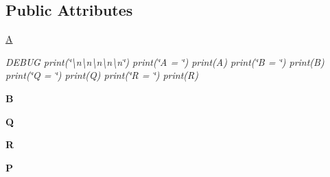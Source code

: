\subsection*{Public Attributes}
\begin{DoxyCompactItemize}
\item 
\mbox{\label{class_d_o_t__assignment_1_1controls_1_1_linear_feedback_const_tracker_ae6ca89f8631d4f212e60a7bcdd1a1c7f}} 
\mbox{\hyperlink{class_d_o_t__assignment_1_1controls_1_1_linear_feedback_const_tracker_ae6ca89f8631d4f212e60a7bcdd1a1c7f}{A}}
\begin{DoxyCompactList}\small\item\em D\+E\+B\+UG print(\char`\"{}\textbackslash{}n\textbackslash{}n\textbackslash{}n\textbackslash{}n\textbackslash{}n\char`\"{}) print(\char`\"{}\+A = \char`\"{}) print(\+A) print(\char`\"{}\+B = \char`\"{}) print(\+B) print(\char`\"{}\+Q = \char`\"{}) print(\+Q) print(\char`\"{}\+R = \char`\"{}) print(\+R) \end{DoxyCompactList}\item 
\mbox{\label{class_d_o_t__assignment_1_1controls_1_1_linear_feedback_const_tracker_ae1fb3b13eca8607104c74088e2190c1b}} 
{\bfseries B}
\item 
\mbox{\label{class_d_o_t__assignment_1_1controls_1_1_linear_feedback_const_tracker_a61d2e8a035a44e057838398946c23c8a}} 
{\bfseries Q}
\item 
\mbox{\label{class_d_o_t__assignment_1_1controls_1_1_linear_feedback_const_tracker_a7cd6f1af49976ac1c672cb6d201f61a5}} 
{\bfseries R}
\item 
\mbox{\label{class_d_o_t__assignment_1_1controls_1_1_linear_feedback_const_tracker_a5b159d678fc5b151e61b6f76023517f2}} 
{\bfseries P}
\item 
\mbox{\label{class_d_o_t__assignment_1_1controls_1_1_linear_feedback_const_tracker_aab133235d5b03664a9c0f0f866ac036e}} 

\end{DoxyCompactItemize}
